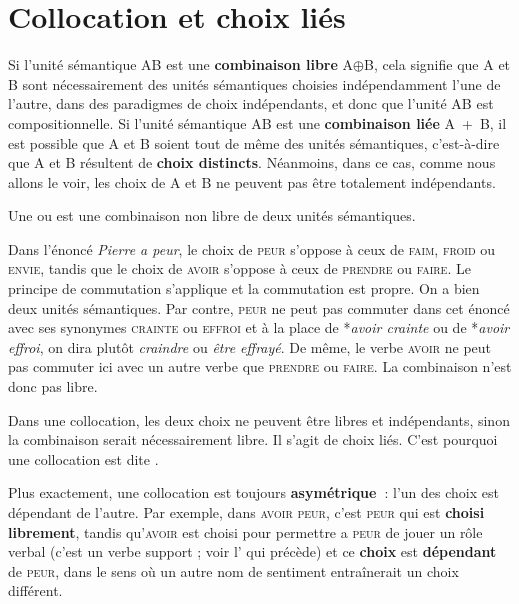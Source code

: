 \section{Collocation et choix liés}\label{sec:2.3.10}

Si l’unité sémantique AB est une \textbf{combinaison libre} A${\oplus}$B, cela signifie que A et B sont nécessairement des unités sémantiques choisies indépendamment l’une de l’autre, dans des paradigmes de choix indépendants, et donc que l’unité AB est compositionnelle. Si l’unité sémantique AB est une \textbf{combinaison liée} A~+~B, il est possible que A et B soient tout de même des unités sémantiques, c’est-à-dire que A et B résultent de \textbf{choix distincts}. Néanmoins, dans ce cas, comme nous allons le voir, les choix de A et B ne peuvent pas être totalement indépendants.

{Une  ou  est une combinaison non libre de deux unités sémantiques.}

Dans l’énoncé \textit{Pierre a peur}, le choix de \textsc{peur} s’oppose à ceux de \textsc{faim,} \textsc{froid} ou \textsc{envie}, tandis que le choix de \textsc{avoir} s’oppose à ceux de \textsc{prendre} ou \textsc{faire}. Le principe de commutation s’applique et la commutation est propre. On a bien deux unités sémantiques. Par contre, \textsc{peur} ne peut pas commuter dans cet énoncé avec ses synonymes \textsc{crainte} ou \textsc{effroi} et à la place de *\textit{avoir crainte} ou de *\textit{avoir effroi}, on dira plutôt \textit{craindre} ou \textit{être effrayé}. De même, le verbe \textsc{avoir} ne peut pas commuter ici avec un autre verbe que \textsc{prendre} ou \textsc{faire}. La combinaison n’est donc pas libre.

{Dans une collocation, les deux choix ne peuvent être libres et indépendants, sinon la combinaison serait nécessairement libre. Il s’agit de choix liés. C’est pourquoi une collocation est dite .}

Plus exactement, une collocation est toujours \textbf{asymétrique~}: l’un des choix est dépendant de l’autre. Par exemple, dans \textsc{avoir} \textsc{peur}, c’est \textsc{peur} qui est \textbf{choisi librement}, tandis qu’\textsc{avoir} est choisi pour permettre a \textsc{peur} de jouer un rôle verbal (c’est un verbe support ; voir l’ qui précède) et ce \textbf{choix} est \textbf{dépendant} de \textsc{peur}, dans le sens où un autre nom de sentiment entraînerait un choix différent.

